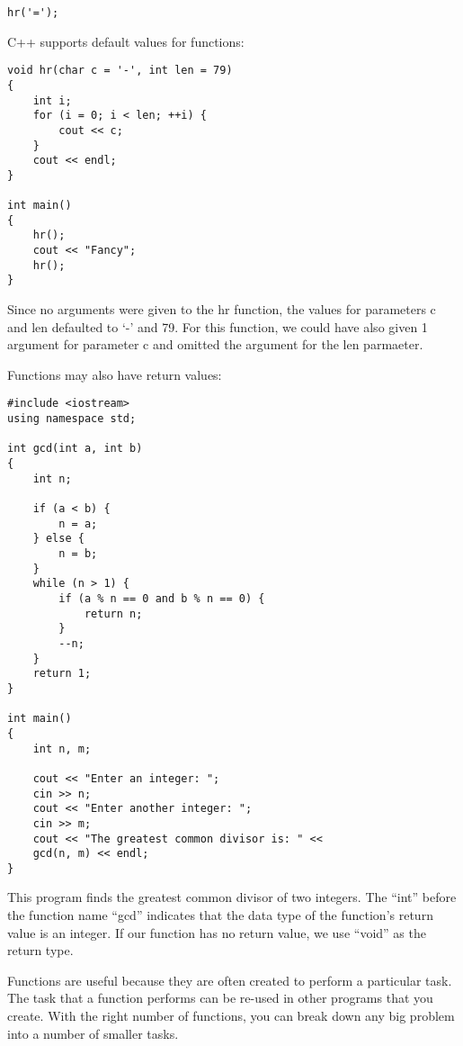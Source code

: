 \documentclass[a4paper,12pt]{article}
\begin{document}
\begin{lstlisting}
hr('=');
\end{lstlisting}

C++ supports default values for functions:

\begin{lstlisting}
void hr(char c = '-', int len = 79)
{
	int i;
	for (i = 0; i < len; ++i) {
		cout << c;
	}
	cout << endl;
}

int main()
{
	hr();
	cout << "Fancy";
	hr();
}
\end{lstlisting}

Since no arguments were given to the hr function, the values for parameters c and len defaulted to `-' and 79. For this function, we could have also given 1 argument for parameter c and omitted the argument for the len parmaeter.

Functions may also have return values:

\begin{lstlisting}[caption=gcd.cpp]
#include <iostream>
using namespace std;

int gcd(int a, int b)
{
	int n;

	if (a < b) {
		n = a;
	} else {
		n = b;
	}
	while (n > 1) {
		if (a % n == 0 and b % n == 0) {
			return n;
		}
		--n;
	}
	return 1;
}

int main()
{
	int n, m;

	cout << "Enter an integer: ";
	cin >> n;
	cout << "Enter another integer: ";
	cin >> m;
	cout << "The greatest common divisor is: " <<
	gcd(n, m) << endl;
}
\end{lstlisting}
This program finds the greatest common divisor of two integers. The ``int'' before the function name ``gcd'' indicates that the data type of the function's return value is an integer. If our function has no return value, we use ``void'' as the return type.

Functions are useful because they are often created to perform a particular task. The task that a function performs can be re-used in other programs that you create. With the right number of functions, you can break down any big problem into a number of smaller tasks.
\end{document}
